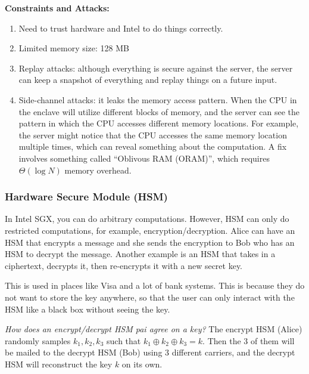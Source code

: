 \textbf{Constraints and Attacks:}

\begin{enumerate}
    \item Need to trust hardware and Intel to do things correctly.
    \item Limited memory size: 128 MB
    \item Replay attacks: although everything is secure against the server, the server can keep a snapshot of everything and replay things on a future input.
    \item Side-channel attacks: it leaks the memory access pattern. When the CPU in the enclave will utilize different blocks of memory, and the server can see the pattern in which the CPU accesses different memory locations. For example, the server might notice that the CPU accesses the same memory location multiple times, which can reveal something about the computation. A fix involves something called ``Oblivous RAM (ORAM)'', which requires $\Theta (\log N)$ memory overhead.
\end{enumerate}

\subsubsection{Hardware Secure Module (HSM)}

In Intel SGX, you can do arbitrary computations. However, HSM can only do restricted computations, for example, encryption/decryption. Alice can have an HSM that encrypts a message and she sends the encryption to Bob who has an HSM to decrypt the message. Another example is an HSM that takes in a ciphertext, decrypts it, then re-encrypts it with a new secret key.

This is used in places like Visa and a lot of bank systems. This is because they do not want to store the key anywhere, so that the user can only interact with the HSM like a black box without seeing the key.

\textit{How does an encrypt/decrypt HSM pai agree on a key?} The encrypt HSM (Alice) randomly samples $k_1, k_2, k_3$ such that $k_1 \oplus k_2 \oplus k_3 = k$. Then the 3 of them will be mailed to the decrypt HSM (Bob) using 3 different carriers, and the decrypt HSM will reconstruct the key $k$ on its own.